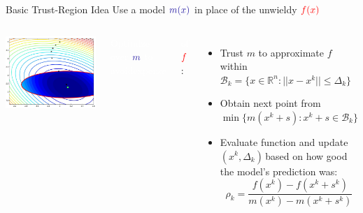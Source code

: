 \documentclass[handout,aspectratio=54]{beamer}
\numberwithin{theorem}{section}
\begin{document}
\begin{frame}{Basic Trust-Region Idea}
Use a model $\textcolor{blue}{m(x)}$ in place of the unwieldy $\textcolor{red}{f(x)}$

\begin{columns}
\includegraphics[width=\textwidth]{fig/22-7.jpg}

\colorbox[rgb]{0.5,0.6,0.7}{\textcolor{white}{Optimize over }$\textcolor{blue}{m}$ \textcolor{white}{to avoidexpense }}

\colorbox[rgb]{0.5,0.6,0.7}{\textcolor{white}{of} $\textcolor{red}{f}$:}

\begin{itemize}
\item Trust $m$ to approximate $f$ within $ \mathcal{B}_k=\{x\in\mathbb{R}^n:||x-x^k||\le \Delta_k\}$
\item Obtain next point from $\min\{m(x^k+s):x^k+s\in  \mathcal{B}_k\}$
\item Evaluate function and update $(x^k, \Delta_k)$\,based on how good the model's prediction was:
\begin{equation*}
\rho_k=\frac{f(x^k)-f(x^k+s^k)}{m(x^k)-m(x^k+s^k)}
\end{equation*}
\end{itemize}

\footnotesize{}
\end{columns}
\end{frame}
\end{document}
